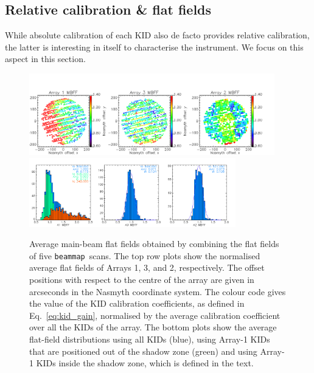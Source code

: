 \documentclass[traditionalabstract]{aa}
\newcommand{\bm}{{\tt beammap}}
\newcommand{\lp}[1]{#1}
\begin{document}
{\subsection{Relative calibration \& flat fields}
\label{se:flat_field}
While absolute calibration of each KID also de facto provides
relative calibration, the latter is interesting in itself to
characterise the instrument. We focus on this aspect in this
section.

\begin{figure}[!thbp] 
\begin{center}
  \includegraphics[width=0.95\textwidth]{Figures/Average_main_beam_flat_field_N2R9_10.png}
  \includegraphics[width=0.8\textwidth]{Figures/Histo_average_main_beam_flat_field_N2R9_10.png}
\caption[Average main beam flat fields]{Average main-beam flat fields
  obtained by combining the flat fields of five
  \bm\ scans. The top row plots show the normalised average flat fields of Arrays
  1, 3, and 2, respectively. {\lp The offset positions with respect to the centre of
  the array are given in arcseconds in the Nasmyth coordinate
  system. The colour code gives the value of the KID calibration
  coefficients, as defined in Eq.~\ref{eq:kid_gain}, normalised by the
  average calibration coefficient over all the
  KIDs of the array.} The bottom plots
  show the average flat-field distributions using all KIDs (blue),
  using Array-1 KIDs that are positioned out of the shadow zone
  (green) and using Array-1 KIDs inside the shadow zone, which is
  defined in the text.}
 \label{fig:avg_mbff}
\end{center}
\end{figure}

}
\end{document}
